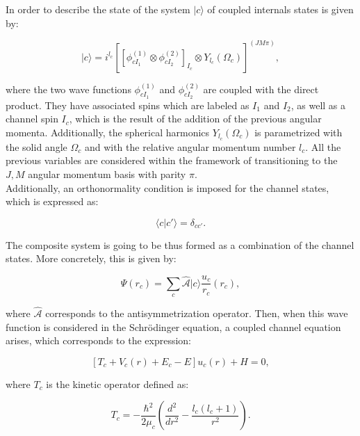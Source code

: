 \documentclass[openany]{book}
\begin{document}
In order to describe the state of the system $	|c\rangle$ of coupled internals states is given by: 

\begin{equation}\label{rmatrix_channels_state}
	|c\rangle = i^{l_c} [[\phi^{(1)}_{cI_1} \otimes  \phi^{(2)}_{cI_2}]_{I_c} \otimes Y_{l_c}(\Omega_c) ]^{(JM\pi)},
\end{equation}

where the two wave functions $\phi^{(1)}_{cI_1}$ and $\phi^{(2)}_{cI_2}$ are coupled with the direct product. They have associated spins which are labeled as $I_1$ and $I_2$, as well as a channel spin $I_c$, which is the result of the addition of the previous angular momenta. Additionally, the spherical harmonics $Y_{l_c}(\Omega_c)$ is parametrized with the solid angle $\Omega_c$ and with the relative angular momentum number $l_c$. All the previous variables are considered within the framework of transitioning to the $J, M$ angular momentum basis with parity $\pi$. \\

Additionally, an orthonormality condition is imposed for the channel states, which is expressed as: 

\begin{equation}\label{rmatrix_channels_orthonormality}
	\langle c| c' \rangle = \delta_{cc'}.
\end{equation}

The composite system is going to be thus formed as a combination of the channel states. More concretely, this is given by: 

\begin{equation}\label{rmatrix_channels_systemState}
	\Psi(r_c) = \sum_{c} \hat {\mathcal{A}} |c \rangle \frac{u_c}{r_c}(r_c),
\end{equation}

where $\hat{\mathcal{A}}$ corresponds to the antisymmetrization operator. Then, when this wave function is considered in the Schrödinger equation, a coupled channel equation arises, which corresponds to the expression:

\begin{equation}\label{rmatrix_channels_coupledEquation}
	[T_c + V_c(r) + E_c - E]u_c(r) + H =0,
\end{equation}

where $T_c$ is the kinetic operator defined as:

\begin{equation}\label{rmatrix_channels_kineticOperator}
	T_c = -\frac{\hbar^2}{2\mu_c} \left(\frac{d^2}{dr^2} - \frac{l_c(l_c + 1)}{r^2}\right).
\end{equation}
\end{document}
